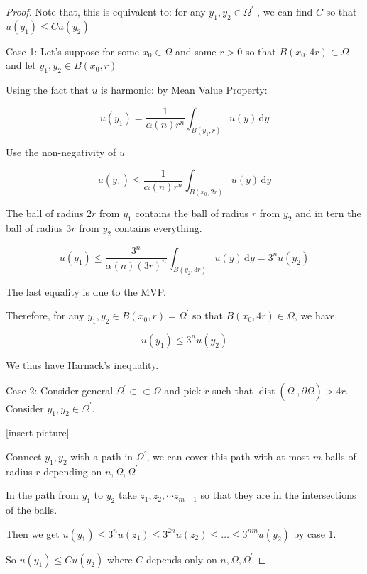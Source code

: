 \documentclass{article}
\theoremstyle{definition}
\begin{document}
\begin{proof}

    Note that, this is equivalent to: for any \(y_1,y_2\in \Omega ^{\prime} \) , we can find \(C\) so that \(u(y_1) \leq C u(y_2)\) 

    Case 1: Let's suppose for some \(x_0 \in \Omega\) and some \(r > 0\) so that \(B(x_0, 4r) \subset \Omega\) and let \(y_1, y_2 \in B(x_0,r)\) 

    Using the fact that \(u\) is harmonic: by Mean Value Property:

    \[
        u(y_1) = \frac{1}{\alpha (n)r ^ n} \int_{B(y_1,r)}^{} u(y) \,\mathrm{d}y
    \]

    Use the non-negativity of \(u\) 

    \[
        u(y_1) \leq \frac{1}{\alpha (n) r ^ n} \int_{B(x_0, 2r)}^{} u(y) \,\mathrm{d}y 
    \]

    The ball of radius \(2r\) from \(y_1\) contains the ball of radius \(r\) from \(y_2\) and in tern the ball of radius \(3r\) from \(y_2\) contains everything.

    \[
        u(y_1) \leq \frac{3^n}{\alpha (n) (3r)^n} \int_{B(y_2, 3r)}^{} u(y) \,\mathrm{d}y = 3^n u(y_2)
    \]

    The last equality is due to the MVP.

    Therefore, for any \( y_1,y_2\in B(x_0,r)=\Omega ^{\prime} \) so that \(B(x_0,4r)\in \Omega\), we have 

    \[
        u(y_1) \leq 3^n u(y_2)
    \]

    We thus have Harnack's inequality.

    Case 2: Consider general \(\Omega ^{\prime} \subset \subset \Omega \) and pick \(r\) such that \(\operatorname{dist}(\Omega ^{\prime} , \partial \Omega ) > 4r\). Consider \(y_1,y_2\in \Omega ^{\prime} \).

    [insert picture]

    Connect \(y_1,y_2\) with a path in \(\Omega ^{\prime} \), we can cover this path with at most \(m\) balls of radius \(r\) depending on \(n,\Omega ,\Omega ^{\prime} \) 

    In the path from \(y_1\) to \(y_2\) take \(z_1,z_2,\cdots z_{m-1}\) so that they are in the intersections of the balls.

    Then we get \(u(y_1) \leq 3^n u(z_1) \leq 3^{2n} u(z_2) \leq \dots \leq 3^{nm} u(y_2)  \) by case 1.

    So \(u(y_1) \leq C u(y_2)\) where \(C\) depends only on \(n, \Omega , \Omega^{\prime} \) 

\end{proof}
\end{document}
